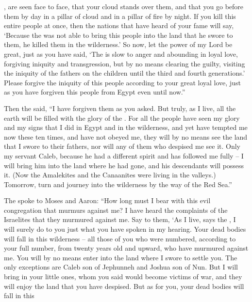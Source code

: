 {{},
are seen
face
to face,
that your
cloud
stands
over
them, and that
you
go
before
them by day
in a pillar
of cloud
and in a pillar
of fire
by night.
If you kill
this
entire people
at once,
then the nations
that
have heard
of your fame
will say,
‘Because the
{}
was not
able
to bring
this
people
into
the land
that
he swore
to them, he killed
them in the wilderness.’
So now,
let
the power
of my Lord
be great,
just
as you have said,
‘The
{}
is slow
to anger
and abounding
in loyal love,
forgiving
iniquity
and transgression,
but by no
means clearing
the guilty, visiting
the iniquity
of
the fathers
on
the children until
the third and fourth generations.’
Please
forgive
the iniquity
of this
people
according to your great
loyal love,
just as
you have forgiven
this
people
from Egypt
even until
now.”
\par }{\PP {}Then the
{}
said,
“I have forgiven
them as
you asked.
But truly,
as I
live,
all
the earth
will be filled
with the glory
of the {}.
For
all
the people
have seen
my glory
and my signs
that
I did
in Egypt
and in the wilderness,
and yet have tempted
me now these
ten
times,
and have not
obeyed
me,
they will by no means
see
the land
that
I swore
to their fathers,
nor
will any
of them who despised
me see it.
Only my servant
Caleb,
because
he had a different
spirit
and has followed
me fully
– I will bring
him into
the land
where
he had gone,
and his descendants
will possess it.
(Now the Amalekites
and the Canaanites
were living
in the valleys.) Tomorrow,
turn
and journey
into the wilderness
by the way
of the Red
Sea.”
\par }{\PP {}The
{}
spoke
to
Moses
and Aaron:
“How long
must I bear with this
evil
congregation
that
murmurs
against
me? I have heard
the complaints
of the Israelites
that
they
murmured
against me.
Say
to
them, ‘As I
live,
says
the {}, I will surely do to you just
what you have spoken
in my hearing.
Your dead bodies
will fall
in this
wilderness
– all
those of you who were numbered,
according to your full number,
from twenty
years
old and upward,
who have
murmured
against me.
You
will by no means
enter
into
the land
where
I swore
to settle
you. The only exceptions
are Caleb
son
of Jephunneh
and Joshua
son
of Nun.
But I will bring
in your little ones,
whom
you said
would become
victims of war,
and they will enjoy
the land
that
you have despised.
But as for you, your dead bodies
will fall
in this
}
